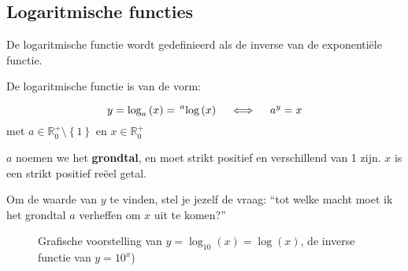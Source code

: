 

\subsection{Logaritmische functies}


\begin{definitie}
	De logaritmische functie wordt gedefinieerd als de inverse
van de exponenti\"ele functie.

De logaritmische functie is van de vorm:

\begin{equation}
 y=\log_{a}\left(x\right)=\sideset{^{a}}{\left(x\right)}\log\quad\iff\quad a^{y}=x
\end{equation}
met $a\in\mathbb{R}_{0}^{+}\setminus\left\{ 1\right\}$
en $x\in\mathbb{R}_{0}^{+}$

$a$ noemen we het \textbf{grondtal}, en moet strikt positief
en verschillend van 1 zijn. $x$ is een strikt positief re\"eel getal.
\end{definitie}


Om de waarde van $y$ te vinden, stel je jezelf de vraag: ``tot
welke macht moet ik het grondtal $a$ verheffen om $x$ uit te komen?''


\begin{figure}[H]
	\centering
	
\caption{Grafische voorstelling van $y=\log_{10}\left(x\right)=\log(x)$, de inverse functie van $y= 10^x$)}

\end{figure}

